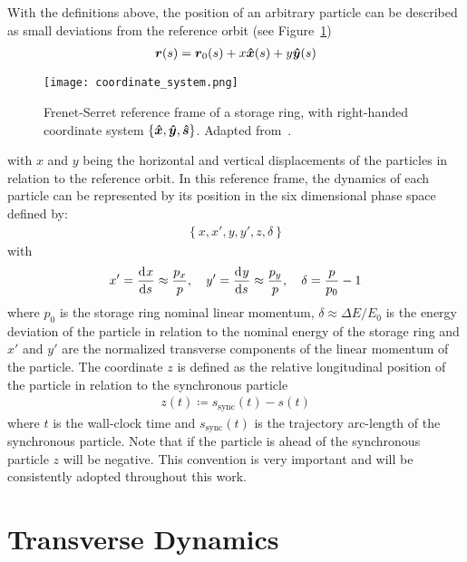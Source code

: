     With the definitions above, the position of an arbitrary particle can be described as small deviations from the reference orbit (see Figure~\ref{fig:reference_frame})
    \begin{align}
        \boldsymbol{r}(s) = \boldsymbol{r}_0(s) + x\boldsymbol{\hat x}(s) + y\boldsymbol{\hat y}(s)
    \end{align}
    \begin{figure}
        \centering
        \texttt{[image: coordinate\_system.png]}
        \caption[Frenet-Serret reference frame of a storage ring.]{Frenet-Serret reference frame of a storage ring, with right-handed coordinate system $\{ \boldsymbol{\hat x}, \boldsymbol{\hat y}, \boldsymbol{\hat s} \}$. Adapted from~\cite[pp. 123]{Lee1999}.}
        \label{fig:reference_frame}
    \end{figure}
    with $x$ and $y$ being the horizontal and vertical displacements of the particles in relation to the reference orbit. In this reference frame, the dynamics of each particle can be represented by its position in the six dimensional phase space defined by:
    \begin{align}\label{eq:phase_space_definition}
        \left\{ x, x', y, y', z, \delta \right\}
    \end{align}
    with
    \begin{align}
        x' = \frac{\mathrm{d}^{{}}x}{\mathrm{d} s^{{}}} \approx \frac{p_x}{p},\quad
        y' = \frac{\mathrm{d}^{{}}y}{\mathrm{d} s^{{}}} \approx \frac{p_y}{p},\quad
        \delta = \frac{p}{p_0}-1
    \end{align}
    where $p_0$ is the storage ring nominal linear momentum, $\delta \approx \Delta E/E_0$ is the energy deviation of the particle in relation to the nominal energy of the storage ring and $x'$ and $y'$ are the normalized transverse components of the linear momentum of the particle. The coordinate $z$ is defined as the relative longitudinal position of the particle in relation to the synchronous particle
    \begin{align}\label{eq:longitudinal_deviations}
        z(t) \coloneqq s_\text{sync}(t) - s(t)
    \end{align}
    where $t$ is the wall-clock time and $s_\text{sync}(t)$ is the trajectory arc-length of the synchronous particle. Note that if the particle is ahead of the synchronous particle $z$ will be negative. This convention is very important and will be consistently adopted throughout this work.

\section{Transverse Dynamics}

